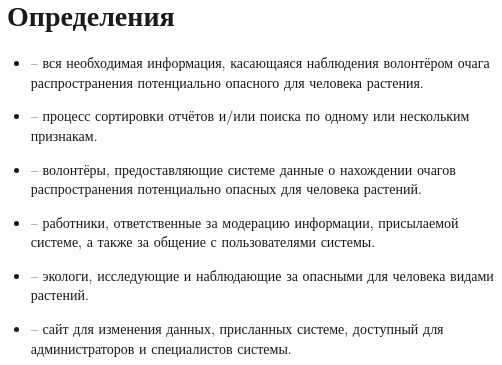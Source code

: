 \section{Определения}

\begin{itemize}[topsep=0pt, parsep=0pt, itemsep=0pt, wide=0.5cm]
	\item {} -- вся необходимая информация, касающаяся наблюдения волонтёром очага распространения потенциально опасного для человека растения.
	\item {} -- процесс сортировки отчётов и/или поиска по одному или нескольким признакам.
	\item {} -- волонтёры, предоставляющие системе данные о нахождении очагов распространения потенциально опасных для человека растений.
	\item {} -- работники, ответственные за модерацию информации, присылаемой системе, а также за общение с пользователями системы.
	\item {} -- экологи, исследующие и наблюдающие за опасными для человека видами растений.
	\item {} -- сайт для изменения данных, присланных системе, доступный для администраторов и специалистов системы.
\end{itemize}

\clearpage
